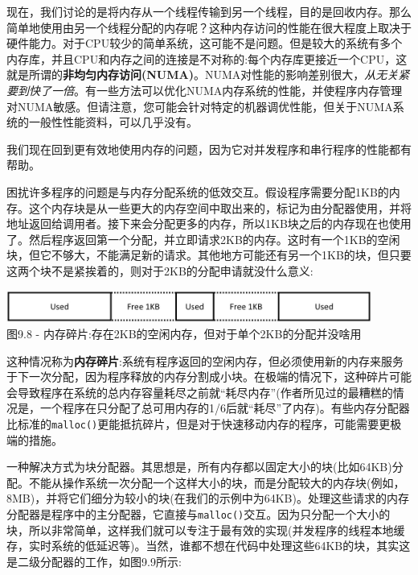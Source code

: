 现在，我们讨论的是将内存从一个线程传输到另一个线程，目的是回收内存。那么简单地使用由另一个线程分配的内存呢？这种内存访问的性能在很大程度上取决于硬件能力。对于CPU较少的简单系统，这可能不是问题。但是较大的系统有多个内存库，并且CPU和内存之间的连接是不对称的:每个内存库更接近一个CPU，这就是所谓的\textbf{非均匀内存访问(NUMA)}。NUMA对性能的影响差别很大，\textit{从无关紧要到快了一倍}。有一些方法可以优化NUMA内存系统的性能，并使程序内存管理对NUMA敏感。但请注意，您可能会针对特定的机器调优性能，但关于NUMA系统的一般性性能资料，可以几乎没有。

我们现在回到更有效地使用内存的问题，因为它对并发程序和串行程序的性能都有帮助。


困扰许多程序的问题是与内存分配系统的低效交互。假设程序需要分配1KB的内存。这个内存块是从一些更大的内存空间中取出来的，标记为由分配器使用，并将地址返回给调用者。接下来会分配更多的内存，所以1KB块之后的内存现在也使用了。然后程序返回第一个分配，并立即请求2KB的内存。这时有一个1KB的空闲块，但它不够大，不能满足新的请求。其他地方可能还有另一个1KB的块，但只要这两个块不是紧挨着的，则对于2KB的分配申请就没什么意义:

\begin{center}
\includegraphics[width=0.9\textwidth]{content/3/chapter9/images/8.jpg}\\
图9.8 - 内存碎片:存在2KB的空闲内存，但对于单个2KB的分配并没啥用
\end{center}

这种情况称为\textbf{内存碎片}:系统有程序返回的空闲内存，但必须使用新的内存来服务于下一次分配，因为程序释放的内存分割成小块。在极端的情况下，这种碎片可能会导致程序在系统的总内存容量耗尽之前就“耗尽内存”(作者所见过的最糟糕的情况是，一个程序在只分配了总可用内存的1/6后就“耗尽”了内存)。有些内存分配器比标准的\texttt{malloc()}更能抵抗碎片，但是对于快速移动内存的程序，可能需要更极端的措施。

一种解决方式为块分配器。其思想是，所有内存都以固定大小的块(比如64KB)分配。不能从操作系统一次分配一个这样大小的块，而是分配较大的内存块(例如，8MB)，并将它们细分为较小的块(在我们的示例中为64KB)。处理这些请求的内存分配器是程序中的主分配器，它直接与\texttt{malloc()}交互。因为只分配一个大小的块，所以非常简单，这样我们就可以专注于最有效的实现(并发程序的线程本地缓存，实时系统的低延迟等)。当然，谁都不想在代码中处理这些64KB的块，其实这是二级分配器的工作，如图9.9所示:

